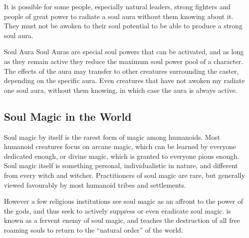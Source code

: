 It is possible for some people, especially natural leaders, strong fighters
and people of great power to radiate a soul aura without them knowing about it.
They must not be awoken to their soul potential to be able to produce a strong
soul aura.

\begin{35e}{Soul Aura}
  Soul Auras are special soul powers that can be activated, and as long as
  they remain active they reduce the maximum soul power pool of a character. The
  effects of the aura may transfer to other creatures surrounding the caster,
  depending on the specific aura. Even creatures that have not awoken my radiate
  one soul aura, without them knowing, in which case the aura is always active.
\end{35e}

\subsection{Soul Magic in the World}
\label{sec:Soul Magic in the World}

Soul magic by itself is the rarest form of magic among humanoids. Most humanoid
creatures focus on arcane magic, which can be learned by everyone dedicated
enough, or divine magic, which is granted to everyone pious enough. Soul magic
itself is something personal, individualistic in nature, and different from
every witch and witcher. Practitioners of soul magic are rare, but generally
viewed favourably by most humanoid tribes and settlements.

However a few religious institutions see soul magic as an affront to the power
of the gods, and thus seek to actively suppress or even eradicate soul magic.
 is known as a fervent enemy of soul magic, and teaches the
destruction of all free roaming souls to return to the ``natural order'' of
the world.
